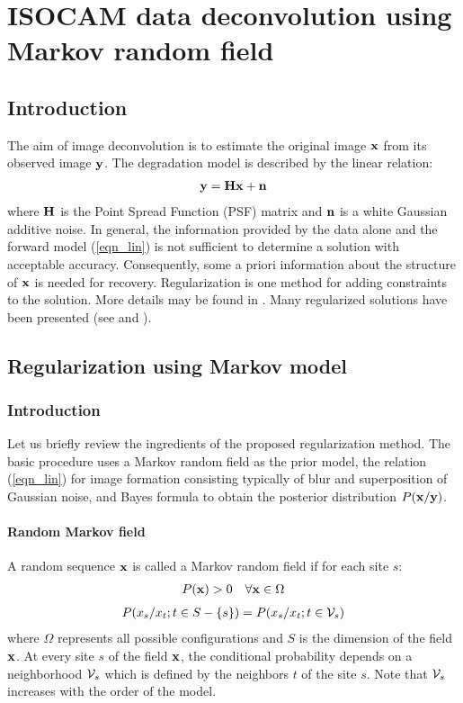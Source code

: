 

\chapter{ISOCAM data deconvolution using Markov random field}
 
\section{Introduction}

The aim of image deconvolution is to estimate the original image $\bf x$ from its
observed image $\bf y$. The degradation model is described by the linear
relation:
\begin{eqnarray}
{\bf y = H x + n }  
\label{eqn_lin}
\end{eqnarray}
where $\bf H$ is the Point Spread Function (PSF) matrix and $\bf n$ is 
a white Gaussian additive noise.
In general, the information provided by the data alone and the forward model 
(\ref{eqn_lin}) is not sufficient to
determine a solution with acceptable accuracy.
Consequently, some a priori information about the structure of $\bf x$ is needed
for recovery. Regularization is one method for adding constraints to the solution.
More details may be found in \cite{rest:demoment89}.
Many regularized solutions have been presented (see \cite{starck:sta94_1} and 
\cite{rest:blancferaud96}).

\section{Regularization using Markov model}

\subsection{Introduction}

Let us briefly review the ingredients of the proposed regularization method.
The basic procedure uses a Markov random field as the prior model, 
the relation (\ref{eqn_lin}) for image formation consisting typically of blur and superposition
of Gaussian noise, and Bayes formula to obtain the posterior distribution $P(\bf
x/y)$. 

\subsubsection{Random Markov field}

A random sequence $\bf x$ is called a Markov random field if for each site $s$:
\begin{eqnarray}
P({\bf x}) > 0 && \forall {\bf x}\in \Omega  
\end{eqnarray}
\begin{eqnarray}
P(x_s/x_t;t\in S-\{s\}) = P(x_s/x_t;t\in{{\cal V}_s}) 
\end{eqnarray}
where $\Omega$ represents all possible configurations and $S$ is the dimension of
the field $\bf x$.
At every site $s$ of the field $\bf x$, the conditional probability  
depends on a neighborhood ${\cal V}_s$ which is defined by the neighbors $t$ of the 
site $s$. Note that ${\cal V}_s$ increases with the order of the model.

